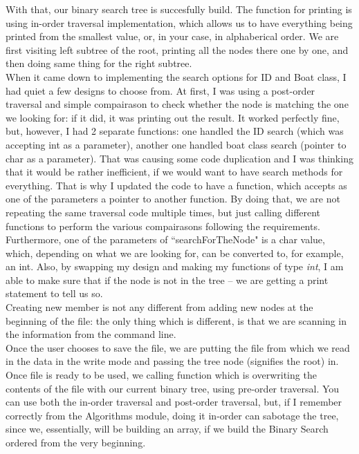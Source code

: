 \documentclass[a4paper,12pt]{article}
\begin{document}
With that, our binary search tree is succesfully build. The function for printing is using in-order traversal implementation, which allows us to have everything being printed from the smallest value, or, in your case, in alphaberical order. We are first visiting left subtree of the root, printing all the nodes there one by one, and then doing same thing for the right subtree. \\

When it came down to implementing the search options for ID and Boat class, I had quiet a few designs to choose from. At first, I was using a post-order traversal and simple compairason to check whether the node is matching the one we looking for: if it did, it was printing out the result. It worked perfectly fine, but, however, I had 2 separate functions: one handled the ID search (which was accepting int as a parameter), another one handled boat class search (pointer to char as a parameter). That was causing some code duplication and I was thinking that it would be rather inefficient, if we would want to have search methods for everything. That is why I updated the code to have a function, which accepts as one of the parameters a pointer to another function. By doing that, we are not repeating the same traversal code multiple times, but just calling different functions to perform the various compairasons following the requirements. Furthermore, one of the parameters of ``searchForTheNode" is a char value, which, depending on what we are looking for, can be converted to, for example, an int. Also, by swapping my design and making my functions of type \emph{int}, I am able to make sure that if the node is not in the tree – we are getting a print statement to tell us so. \\

Creating new member is not any different from  adding new nodes at the beginning of the file: the only thing which is different, is that we are scanning in the information from the command line. \\

Once the user chooses to save the file, we are putting the file from which we read in the data in the write mode\cite{fileio} and passing the tree node (signifies the root) in. Once file is ready to be used, we calling function which is overwriting the contents of the file with our current binary tree, using pre-order traversal. You can use both the in-order traversal and post-order traversal, but, if I remember correctly from the Algorithms module, doing it in-order can sabotage the tree, since we, essentially, will be building an array, if we build the Binary Search ordered from the very beginning. \\
\end{document}
